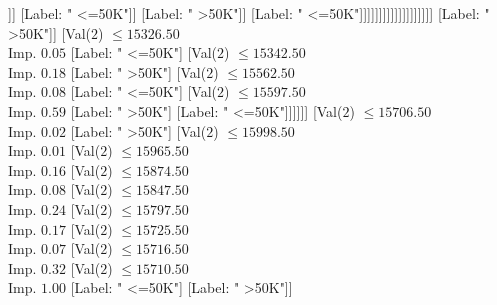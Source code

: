 \documentclass[margin=10pt]{standalone}
\begin{document}
\begin{forest}
																																		[Label: " >50K"]
																																		[Val($2$) $ \leq 15098.50$ \\ Imp. $0.07$
																																			[Val($2$) $ \leq 15095.50$ \\ Imp. $0.17$
																																				[Val($2$) $ \leq 15063.50$ \\ Imp. $0.15$
																																					[Val($2$) $ \leq 15016.50$ \\ Imp. $0.29$
																																						[Label: " <=50K"]
																																						[Val($2$) $ \leq 15021.50$ \\ Imp. $0.31$
																																							[Label: " >50K"]
																																							[Label: " <=50K"]]]
																																					[Label: " <=50K"]]
																																				[Label: " >50K"]]
																																			[Label: " <=50K"]]]]]]]]]]]]]]]]]]]
																	[Label: " >50K"]]
																[Val($2$) $ \leq 15326.50$ \\ Imp. $0.05$
																	[Label: " <=50K"]
																	[Val($2$) $ \leq 15342.50$ \\ Imp. $0.18$
																		[Label: " >50K"]
																		[Val($2$) $ \leq 15562.50$ \\ Imp. $0.08$
																			[Label: " <=50K"]
																			[Val($2$) $ \leq 15597.50$ \\ Imp. $0.59$
																				[Label: " >50K"]
																				[Label: " <=50K"]]]]]]
															[Val($2$) $ \leq 15706.50$ \\ Imp. $0.02$
																[Label: " >50K"]
																[Val($2$) $ \leq 15998.50$ \\ Imp. $0.01$
																	[Val($2$) $ \leq 15965.50$ \\ Imp. $0.16$
																		[Val($2$) $ \leq 15874.50$ \\ Imp. $0.08$
																			[Val($2$) $ \leq 15847.50$ \\ Imp. $0.24$
																				[Val($2$) $ \leq 15797.50$ \\ Imp. $0.17$
																					[Val($2$) $ \leq 15725.50$ \\ Imp. $0.07$
																						[Val($2$) $ \leq 15716.50$ \\ Imp. $0.32$
																							[Val($2$) $ \leq 15710.50$ \\ Imp. $1.00$
																								[Label: " <=50K"]
																								[Label: " >50K"]]

\end{forest}
\end{document}
